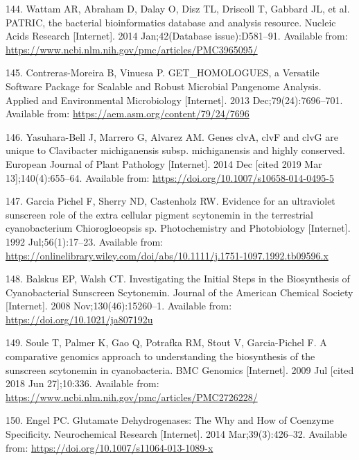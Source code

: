 \documentclass[12pt,twoside]{reedthesis}
\begin{document}
{  \hypertarget{ref-wattam_patric_2014}{}
  144. Wattam AR, Abraham D, Dalay O, Disz TL, Driscoll T, Gabbard JL, et
  al. PATRIC, the bacterial bioinformatics database and analysis resource.
  Nucleic Acids Research {[}Internet{]}. 2014 Jan;42(Database
  issue):D581--91. Available from:
  \url{https://www.ncbi.nlm.nih.gov/pmc/articles/PMC3965095/}
  
  \hypertarget{ref-contreras-moreira_get_homologues_2013}{}
  145. Contreras-Moreira B, Vinuesa P. GET\_HOMOLOGUES, a Versatile
  Software Package for Scalable and Robust Microbial Pangenome Analysis.
  Applied and Environmental Microbiology {[}Internet{]}. 2013
  Dec;79(24):7696--701. Available from:
  \url{https://aem.asm.org/content/79/24/7696}
  
  \hypertarget{ref-yasuhara-bell_genes_2014}{}
  146. Yasuhara-Bell J, Marrero G, Alvarez AM. Genes clvA, clvF and clvG
  are unique to Clavibacter michiganensis subsp. michiganensis and highly
  conserved. European Journal of Plant Pathology {[}Internet{]}. 2014 Dec
  {[}cited 2019 Mar 13{]};140(4):655--64. Available from:
  \url{https://doi.org/10.1007/s10658-014-0495-5}
  
  \hypertarget{ref-garciapichel_evidence_1992}{}
  147. Garcia Pichel F, Sherry ND, Castenholz RW. Evidence for an
  ultraviolet sunscreen role of the extra cellular pigment scytonemin in
  the terrestrial cyanobacterium Chiorogloeopsis sp. Photochemistry and
  Photobiology {[}Internet{]}. 1992 Jul;56(1):17--23. Available from:
  \url{https://onlinelibrary.wiley.com/doi/abs/10.1111/j.1751-1097.1992.tb09596.x}
  
  \hypertarget{ref-balskus_investigating_2008}{}
  148. Balskus EP, Walsh CT. Investigating the Initial Steps in the
  Biosynthesis of Cyanobacterial Sunscreen Scytonemin. Journal of the
  American Chemical Society {[}Internet{]}. 2008 Nov;130(46):15260--1.
  Available from: \url{https://doi.org/10.1021/ja807192u}
  
  \hypertarget{ref-soule_comparative_2009}{}
  149. Soule T, Palmer K, Gao Q, Potrafka RM, Stout V, Garcia-Pichel F. A
  comparative genomics approach to understanding the biosynthesis of the
  sunscreen scytonemin in cyanobacteria. BMC Genomics {[}Internet{]}. 2009
  Jul {[}cited 2018 Jun 27{]};10:336. Available from:
  \url{https://www.ncbi.nlm.nih.gov/pmc/articles/PMC2726228/}
  
  \hypertarget{ref-engel_glutamate_2014}{}
  150. Engel PC. Glutamate Dehydrogenases: The Why and How of Coenzyme
  Specificity. Neurochemical Research {[}Internet{]}. 2014
  Mar;39(3):426--32. Available from:
  \url{https://doi.org/10.1007/s11064-013-1089-x}
  
}
\end{document}
